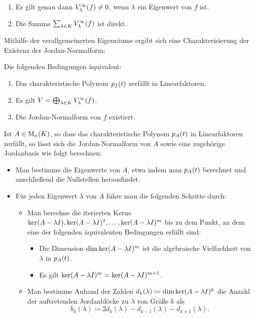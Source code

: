 \begin{lemma}
  \begin{enumerate}
    \item
      Es gilt genau dann $V_{\lambda}^{\infty}(f) \neq 0$, wenn $\lambda$ ein Eigenwert von $f$ ist.
    \item
      Die Summe $\sum_{\lambda \in K} V_{\lambda}^{\infty}(f)$ ist direkt.
  \end{enumerate}
\end{lemma}

Mithilfe der verallgemeinerten Eigenräume ergibt sich eine Charakterisierung der Existenz der Jordan-Normalform:

\begin{theorem}
  \label{theorem: existence of generalized eigespace decomposition and jordan normal form}
  Die folgenden Bedingungen äquivalent:
  \begin{enumerate}
    \item
      Das charakteristische Polynom $p_{f}(t)$ zerfällt in Linearfaktoren.
    \item
      Es gilt $V = \bigoplus_{\lambda \in K} V_{\lambda}^{\infty}(f)$.
    \item
      Die Jordan-Normalform von $f$ existiert.
  \end{enumerate}
\end{theorem}


Ist $A \in \operatorname{M}_{n}(K)$, so dass das charakteristische Polynom $p_{A}(t)$ in Linearfaktoren zerfällt, so lässt sich die Jordan-Normalform von $A$ sowie eine zugehörige Jordanbasis wie folgt berechnen:

\begin{itemize}
  \item
    Man bestimme die Eigenwerte von $A$, etwa indem man $p_{A}(t)$ berechnet und anschließend die Nullstellen herausfindet.
    
  \item
    Für jeden Eigenwert $\lambda$ von $A$ führe man die folgenden Schritte durch:
    \begin{itemize}
      \item
        Man berechne die iterierten Kerne $\ker (A - \lambda I), \ker (A - \lambda I)^2, \dotsc, \ker (A - \lambda I)^m$ bis zu dem Punkt, an dem eine der folgenden äquivalenten Bedingungen erfüllt sind:
        \begin{itemize}
          \item
            Die Dimension $\dim \ker (A - \lambda I)^m$ ist die algebraische Vielfachheit von $\lambda$ in $p_{A}(t)$.
          \item
            Es gilt $\ker (A - \lambda I)^m = \ker (A - \lambda I)^{m+1}$.
        \end{itemize}
      \item
        Man bestimme Anhand der Zahlen $d_k(\lambda) \coloneqq \dim \ker (A - \lambda I)^k$ die Anzahl der auftretenden Jordanblöcke zu $\lambda$ von Größe $k$ als
        \[
          b_k(\lambda) \coloneqq 2 d_k(\lambda) - d_{k-1}(\lambda) - d_{k+1}(\lambda).
        \]
    \end{itemize}
\end{itemize}

